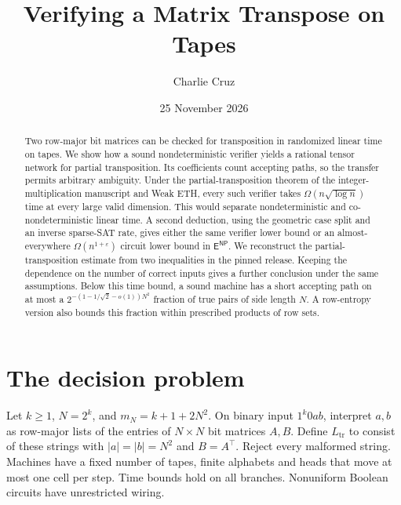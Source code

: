 \documentclass[11pt]{article}
\title{Verifying a Matrix Transpose on Tapes}
\author{Charlie Cruz}
\date{25 November 2026}
\newcommand{\TrLang}{L_{\mathrm{tr}}}
\newcommand{\ENP}{\mathsf E^{\mathsf{NP}}}
\begin{document}
\maketitle

\begin{abstract}
Two row-major bit matrices can be checked for transposition in randomized
linear time on tapes. We show how a sound nondeterministic verifier yields
a rational tensor network for partial transposition. Its coefficients count
accepting paths, so the transfer permits arbitrary ambiguity. Under the
partial-transposition theorem of the integer-multiplication manuscript and
Weak ETH, every such verifier takes $\Omega(n\sqrt{\log n})$ time at every
large valid dimension. This would separate nondeterministic and
co-nondeterministic linear time. A second deduction, using the geometric
case split and an inverse sparse-SAT rate, gives either the same verifier
lower bound or an almost-everywhere $\Omega(n^{1+\varepsilon})$ circuit lower
bound in $\ENP$. We reconstruct the partial-transposition estimate from
two inequalities in the pinned release. Keeping the dependence on the
number of correct inputs gives a further conclusion under the same
assumptions. Below this time bound, a sound machine has a short accepting
path on at most a $2^{-(1-1/\sqrt2-o(1))N^2}$ fraction of true pairs
of side length $N$. A row-entropy version also bounds this fraction
within prescribed products of row sets.
\end{abstract}

\section{The decision problem}
Let $k\ge1$, $N=2^k$, and $m_N=k+1+2N^2$. On binary input $1^k0ab$,
interpret $a,b$ as row-major lists of the entries of $N\times N$ bit
matrices $A,B$. Define $\TrLang$ to consist of these strings with
$|a|=|b|=N^2$ and $B=A^\top$. Reject every malformed string. Machines
have a fixed number of tapes, finite alphabets and heads that move at
most one cell per step. Time bounds hold on all branches. Nonuniform
Boolean circuits have unrestricted wiring.
\end{document}
